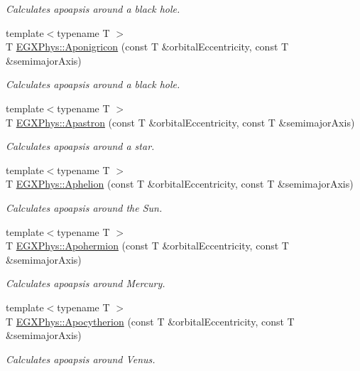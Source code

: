 \begin{DoxyCompactItemize}
\begin{DoxyCompactList}\small\item\em Calculates apoapsis around a black hole. \end{DoxyCompactList}\item 
{\footnotesize template$<$typename T $>$ }\\T \hyperlink{group___apoapsis_ga83e866e2f887ff8eafbc3971d4cab8be}{E\+G\+X\+Phys\+::\+Aponigricon} (const T \&orbital\+Eccentricity, const T \&semimajor\+Axis)
\begin{DoxyCompactList}\small\item\em Calculates apoapsis around a black hole. \end{DoxyCompactList}\item 
{\footnotesize template$<$typename T $>$ }\\T \hyperlink{group___apoapsis_ga2fc1c406ce10f59b4f325150aecd279a}{E\+G\+X\+Phys\+::\+Apastron} (const T \&orbital\+Eccentricity, const T \&semimajor\+Axis)
\begin{DoxyCompactList}\small\item\em Calculates apoapsis around a star. \end{DoxyCompactList}\item 
{\footnotesize template$<$typename T $>$ }\\T \hyperlink{group___apoapsis_ga77dadb4d082a441c8e85203c983722c7}{E\+G\+X\+Phys\+::\+Aphelion} (const T \&orbital\+Eccentricity, const T \&semimajor\+Axis)
\begin{DoxyCompactList}\small\item\em Calculates apoapsis around the Sun. \end{DoxyCompactList}\item 
{\footnotesize template$<$typename T $>$ }\\T \hyperlink{group___apoapsis_gab002349e578241b3514f2212da9a7d48}{E\+G\+X\+Phys\+::\+Apohermion} (const T \&orbital\+Eccentricity, const T \&semimajor\+Axis)
\begin{DoxyCompactList}\small\item\em Calculates apoapsis around Mercury. \end{DoxyCompactList}\item 
{\footnotesize template$<$typename T $>$ }\\T \hyperlink{group___apoapsis_ga59a284bb0bc11848c5b9ef1283033425}{E\+G\+X\+Phys\+::\+Apocytherion} (const T \&orbital\+Eccentricity, const T \&semimajor\+Axis)
\begin{DoxyCompactList}\small\item\em Calculates apoapsis around Venus. \end{DoxyCompactList}\item 

\end{DoxyCompactItemize}
